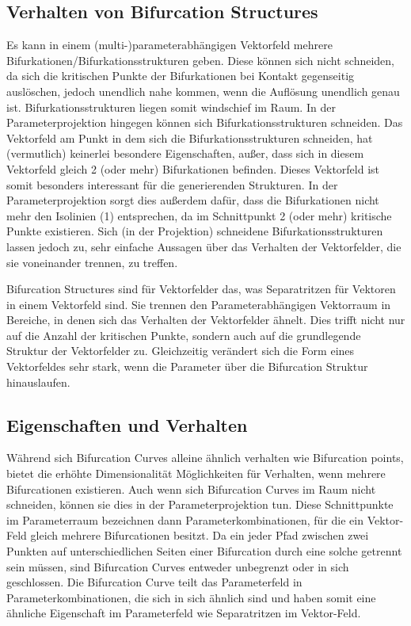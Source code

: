 \documentclass[11pt]{article}
\begin{document}
\subsection{Verhalten von Bifurcation Structures}
Es kann in einem (multi-)parameterabhängigen Vektorfeld mehrere Bifurkationen/Bifurkationsstrukturen geben.
Diese können sich nicht schneiden, da sich die kritischen Punkte der Bifurkationen bei Kontakt gegenseitig auslöschen, jedoch unendlich nahe kommen, wenn die Auflösung unendlich genau ist. Bifurkationsstrukturen liegen somit windschief im Raum. 
In der Parameterprojektion hingegen können sich Bifurkationsstrukturen schneiden. Das Vektorfeld am Punkt in dem sich die Bifurkationsstrukturen schneiden, hat (vermutlich) keinerlei besondere Eigenschaften, außer, dass sich in diesem Vektorfeld gleich 2 (oder mehr) Bifurkationen befinden.
Dieses Vektorfeld ist somit besonders interessant für die generierenden Strukturen.
In der Parameterprojektion sorgt dies außerdem dafür, dass die Bifurkationen nicht mehr den Isolinien (1) entsprechen, da im Schnittpunkt 2 (oder mehr) kritische Punkte existieren.
Sich (in der Projektion) schneidene Bifurkationsstrukturen lassen jedoch zu, sehr einfache Aussagen über das Verhalten der Vektorfelder, die sie voneinander trennen, zu treffen.

Bifurcation Structures sind für Vektorfelder das, was Separatritzen für Vektoren in einem Vektorfeld sind. Sie trennen den Parameterabhängigen Vektorraum in Bereiche, in denen sich das Verhalten der Vektorfelder ähnelt. Dies trifft nicht nur auf die Anzahl der kritischen Punkte, sondern auch auf die grundlegende Struktur der Vektorfelder zu. Gleichzeitig verändert sich die Form eines Vektorfeldes sehr stark, wenn die Parameter über die Bifurcation Struktur hinauslaufen.

\subsection{Eigenschaften und Verhalten}
Während sich Bifurcation Curves alleine ähnlich verhalten wie Bifurcation points, bietet die erhöhte Dimensionalität Möglichkeiten für Verhalten, wenn mehrere Bifurcationen existieren.
Auch wenn sich Bifurcation Curves im Raum nicht schneiden, können sie dies in der Parameterprojektion tun. Diese Schnittpunkte im Parameterraum bezeichnen dann Parameterkombinationen, für die ein Vektor-Feld gleich mehrere Bifurcationen besitzt.
Da ein jeder Pfad zwischen zwei Punkten auf unterschiedlichen Seiten einer Bifurcation durch eine solche getrennt sein müssen, sind Bifurcation Curves entweder unbegrenzt oder in sich geschlossen.
Die Bifurcation Curve teilt das Parameterfeld in Parameterkombinationen, die sich in sich ähnlich sind und haben somit eine ähnliche Eigenschaft im Parameterfeld wie Separatritzen im Vektor-Feld.
\end{document}
